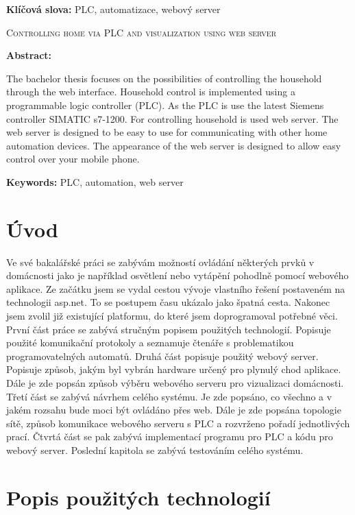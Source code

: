 \documentclass[a4paper,12pt,czech,bibliography=totoc]{scrbook}
\newcommand{\nazeven}{{Controlling home via PLC and visualization using web server}}     %
\begin{document}
\textbf{Klíčová slova:} PLC, automatizace, webový server

\bigskip


\textsc{\nazeven}

\textbf{Abstract:}

The bachelor thesis focuses on the possibilities of controlling the household through the web interface. Household control is implemented using a programmable logic controller (PLC). As the PLC is use the latest Siemens controller SIMATIC s7-1200. For controlling household is used web server. The web server is designed to be easy to use for communicating with other home automation devices. The appearance of the web server is designed to allow easy control over your mobile phone.

\textbf{Keywords:} PLC, automation, web server  


\tableofcontents
\setcounter{chapter}{0}
\chapter{Úvod}
Ve své bakalářské práci se zabývám možností ovládání některých prvků v domácnosti jako je například osvětlení nebo vytápění pohodlně pomocí webového aplikace. Ze začátku jsem se vydal cestou vývoje vlastního řešení postaveném na technologii asp.net. To se postupem času ukázalo jako špatná cesta. Nakonec jsem zvolil již existující platformu, do které jsem doprogramoval potřebné věci.
\newline
První část práce se zabývá stručným popisem použitých technologií. Popisuje použité komunikační protokoly a seznamuje čtenáře s problematikou programovatelných automatů.  
\newline
Druhá část popisuje použitý webový server. Popisuje způsob, jakým byl vybrán hardware určený pro plynulý chod aplikace. Dále je zde popsán způsob výběru webového serveru pro vizualizaci domácnosti.  
\newline
Třetí část se zabývá návrhem celého systému. Je zde popsáno, co všechno a v jakém rozsahu bude moci být ovládáno přes web. Dále je zde popsána topologie sítě, způsob komunikace webového serveru s PLC a rozvrženo pořadí jednotlivých prací.
\newline
Čtvrtá část se pak zabývá implementací programu pro PLC a kódu pro webový server.
\newline
Poslední kapitola se zabývá testováním celého systému.
 

\chapter{Popis použitých technologií}
\end{document}
